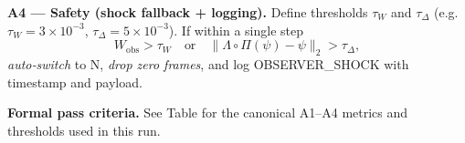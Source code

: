 \vspace{0.5em}
\noindent\textbf{A4 — Safety (shock fallback + logging).}
Define thresholds $\tau_W$ and $\tau_\Delta$ (e.g.\ $\tau_W=3\!\times\!10^{-3}$, $\tau_\Delta=5\!\times\!10^{-3}$).
If within a single step
\[
W_{\mathrm{obs}} > \tau_W \quad\text{or}\quad \|\Lambda\!\circ\!\Pi(\psi)-\psi\|_2 > \tau_\Delta,
\]
\emph{auto‑switch} to N, \emph{drop zero frames}, and log \textsc{OBSERVER\_SHOCK} with timestamp and payload.

\vspace{0.75em}
\noindent\textbf{Formal pass criteria.}
See Table\label{tab:safety-contracts} for the canonical A1–A4 metrics and thresholds used in this run.
